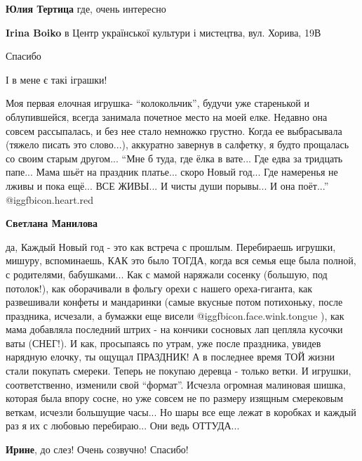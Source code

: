 \begin{itemize}
\begin{itemize} %
\textbf{Юлия Тертица} где, очень интересно

\textbf{Irina Boiko} в Центр української культури і мистецтва, вул. Хорива, 19В

Спасибо

\end{itemize} %

І в мене є такі іграшки!


Моя первая елочная игрушка- \enquote{колокольчик}, будучи уже старенькой и
облупившейся, всегда занимала почетное место на моей елке. Недавно она совсем
рассыпалась, и без нее стало немножко грустно. Когда ее выбрасывала (тяжело
писать это слово...), аккуратно завернув в салфетку, я будто прощалась со своим
старым другом... \enquote{Мне б туда, где ёлка в вате... Где едва за тридцать папе...
Мама шьёт на праздник платье... скоро Новый год... Где намеренья не лживы и
пока ещё... ВСЕ ЖИВЫ... И чисты души порывы... И она поёт...} @igg{fbicon.heart.red}

\begin{itemize} %
\textbf{Светлана Манилова} 

да, Каждый Новый год - это как встреча с прошлым. Перебираешь игрушки, мишуру,
вспоминаешь, КАК это было ТОГДА, когда вся семья еще была полной, с родителями,
бабушками... Как с мамой наряжали сосенку (большую, под потолок!), как
оборачивали в фольгу орехи с нашего ореха-гиганта, как развешивали конфеты и
мандаринки (самые вкусные потом потихоньку, после праздника, исчезали, а бумажки
еще висели @igg{fbicon.face.wink.tongue} ), как мама добавляла последний штрих - на кончики сосновых лап
цепляла кусочки ваты (СНЕГ!). И как, просыпаясь по утрам, уже после праздника,
увидев нарядную елочку, ты ощущал ПРАЗДНИК! А в последнее время ТОЙ жизни стали
покупать смереки. Теперь не покупаю деревца - только ветки. И игрушки,
соответственно, изменили свой \enquote{формат}. Исчезла огромная малиновая шишка,
которая была впору сосне, но уже совсем не по размеру изящным смерековым
веткам, исчезли большущие часы... Но шары все еще лежат в коробках и каждый раз
я их с любовью перебираю... Они ведь ОТТУДА...

\begin{itemize} %
\textbf{Ирине}, до слез! Очень созвучно! Спасибо!


\end{itemize}
\end{itemize}
\end{itemize}
